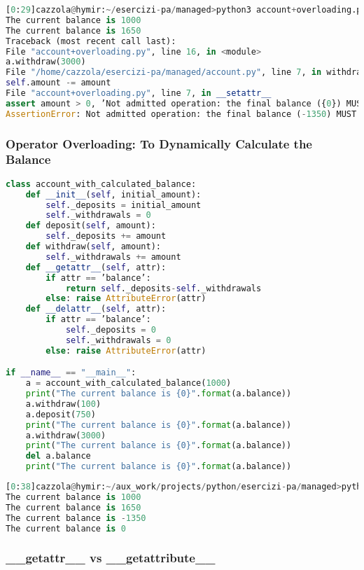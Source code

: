 \begin{lstlisting}[language=Python]
[0:29]cazzola@hymir:~/esercizi-pa/managed>python3 account+overloading.py
The current balance is 1000
The current balance is 1650
Traceback (most recent call last):
File "account+overloading.py", line 16, in <module>
a.withdraw(3000)
File "/home/cazzola/esercizi-pa/managed/account.py", line 7, in withdraw
self.amount -= amount
File "account+overloading.py", line 7, in __setattr__
assert amount > 0, ’Not admitted operation: the final balance ({0}) MUST be positive’.format(amount)
AssertionError: Not admitted operation: the final balance (-1350) MUST be positive
\end{lstlisting}

\subsubsection{Operator Overloading: To Dynamically Calculate the Balance}

\begin{lstlisting}[language=Python]
class account_with_calculated_balance:
	def __init__(self, initial_amount):
		self._deposits = initial_amount
		self._withdrawals = 0
	def deposit(self, amount):
		self._deposits += amount
	def withdraw(self, amount):
		self._withdrawals += amount
	def __getattr__(self, attr):
		if attr == ’balance’:
			return self._deposits-self._withdrawals
		else: raise AttributeError(attr)
	def __delattr__(self, attr):
		if attr == ’balance’:
			self._deposits = 0
			self._withdrawals = 0
		else: raise AttributeError(attr)

if __name__ == "__main__":
	a = account_with_calculated_balance(1000)
	print("The current balance is {0}".format(a.balance))
	a.withdraw(100)
	a.deposit(750)
	print("The current balance is {0}".format(a.balance))
	a.withdraw(3000)
	print("The current balance is {0}".format(a.balance))
	del a.balance
	print("The current balance is {0}".format(a.balance))
\end{lstlisting}

\begin{lstlisting}[language=Python]
[0:38]cazzola@hymir:~/aux_work/projects/python/esercizi-pa/managed>python3 account+overloading2.py
The current balance is 1000
The current balance is 1650
The current balance is -1350
The current balance is 0
\end{lstlisting}

\subsubsection{\_\_getattr\_\_ vs \_\_getattribute\_\_}

